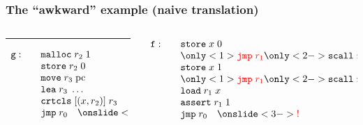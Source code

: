 \documentclass{beamer}
\newcommand{\var}[1]{\mathit{#1}}
\newcommand{\pcreg}{\mathrm{pc}}
\newcommand{\stk}{\var{stk}}
\newcommand{\plaindom}[1]{\mathrm{#1}}
\newcommand{\zinstr}[1]{\mathtt{#1}}
\newcommand{\oneinstr}[2]{\zinstr{#1} \; #2}
\newcommand{\jmp}[1]{\oneinstr{jmp}{#1}}
\newcommand{\twoinstr}[3]{\zinstr{#1} \; #2 \; #3}
\newcommand{\move}[2]{\twoinstr{move}{#1}{#2}}
\newcommand{\store}[2]{\twoinstr{store}{#1}{#2}}
\newcommand{\load}[2]{\twoinstr{load}{#1}{#2}}
\newcommand{\lea}[2]{\twoinstr{lea}{#1}{#2}}
\begin{document}
\begin{frame}
  \frametitle{The ``awkward'' example (naive translation)}
  \begin{columns}
    \begin{column}{0.45\textwidth}
      \scalebox{.75}{\usebox{\awkwardex}}
      \rule{\textwidth}{0.4pt}
      \[
        \begin{array}{lcl}
          \mathtt{g}:
          &  &\mathtt{malloc} \; r_2 \; 1\\
          &  &\store{r_2}{0}\\
          &  &\move{r_3}{\pcreg}\\
          &  &\lea{r_3}{\dots}\\
          &  &\mathtt{crtcls} \;[(x, r_2)] \; r_3\\
          &  &\jmp{r_0} \quad \onslide<3->{\color{red} !} 
        \end{array}
      \]
    \end{column}
    \begin{column}{0.45\textwidth}
      \[
        \begin{array}{lcl}
          \mathtt{f:}
            &  &\store{x}{0}\\
            &  &\only<1>{\color{red} \jmp{r_1}} \only<2->{\mathtt{scall} \; r_1([],[r_0,r_1])}\\
            &  &\store{x}{1}\\
            &  &\only<1>{\color{red} \jmp{r_1}} \only<2->{\mathtt{scall} \; r_1([],[r_0])}\\
            &  &\load{r_1}{x}\\
            &  &\mathtt{assert} \; r_1 \; 1\\
            &  &\jmp{r_0} \quad \onslide<3->{\color{red} !}\\
            &  &\phantom{\mathtt{scall} \; r_1([],[r_0,r_1])}
        \end{array}
      \]
    \end{column}
  \end{columns}
\end{frame}
\end{document}

